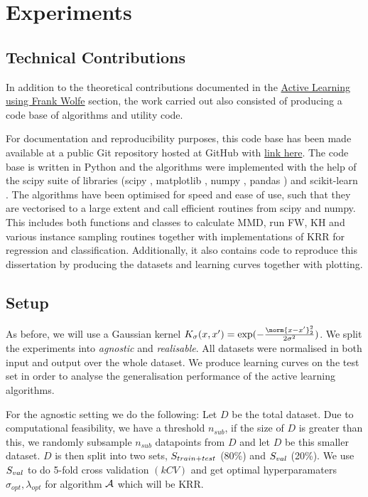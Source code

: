 \chapter{Experiments}
\label{ch:experiments}

\section{Technical Contributions}
In addition to the theoretical contributions documented in the
\hyperref[ch:methodology]{Active Learning using Frank Wolfe} section, the work carried
out also consisted of producing a code base of algorithms and utility code.

For documentation and reproducibility purposes, this code base has been made
available at a public Git repository hosted at GitHub with
\href{https://github.com/IsakFalk/active_learning_code}{link here}. The code
base is written in Python and the algorithms were implemented with the help of
the scipy suite of libraries (scipy \citep{jones--_scipy}, matplotlib
\citep{hunter07_matpl}, numpy \citep{oliphant--_numpy}, pandas
\citep{mckinney_data_struc_statis_comput_python}) and scikit-learn
\citep{pedregosa11_scikit_learn}. The algorithms have been optimised for speed
and ease of use, such that they are vectorised to a large extent and call
efficient routines from scipy and numpy. This includes both functions and
classes to calculate MMD, run FW, KH and various instance sampling routines
together with implementations of KRR for regression and classification.
Additionally, it also contains code to reproduce this dissertation by producing the
datasets and learning curves together with plotting.

\section{Setup}

As before, we will use a Gaussian kernel \(K_{\sigma}(x, x') =
\exp(-\frac{\norm{x - x'}_2^2}{2\sigma^2})\). We split the experiments into
\textit{agnostic} and \textit{realisable}. All datasets were normalised in both
input and output over the whole dataset. We produce learning curves on the
test set in order to analyse the generalisation performance of the active
learning algorithms.

For the agnostic setting we do the following: Let \(D\) be the total dataset. Due
to computational feasibility, we have a threshold \(n_{sub}\), if the size of
\(D\) is greater than this, we randomly subsample \(n_{sub}\) datapoints from
\(D\) and let \(D\) be this smaller dataset. \(D\) is then split into two sets,
\(S_{train+test}\) (80\%) and \(S_{val}\) (20\%). We use
\(S_{val}\) to do 5-fold cross validation \((kCV)\) and get optimal
hyperparamaters \(\sigma_{opt}, \lambda_{opt}\) for algorithm \(\mathcal{A}\) which will
be KRR.

